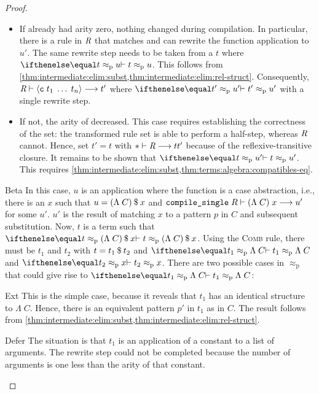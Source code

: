 \begin{proof}
\begin{induction}
      \begin{itemize}
        \item
          If  already had arity zero, nothing changed during compilation.
          In particular, there is a rule in $\textit{R}$ that matches and can rewrite the function application to $u'$.
          The same rewrite step needs to be taken from a $t$ where $\corrp{t}{u}$.
          This follows from \cref{thm:intermediate:elim:subst,thm:intermediate:elim:rel-struct}.
          Consequently, $\textit{R} \vdash \left\langle\texttt{\textup{c}}\;t_1\;\ldots\;t_n\right\rangle \longrightarrow t'$ where $\corrp{t'}{u'}$ with a single rewrite step.
        \item
          If not, the arity of  decreased.
          This case requires establishing the correctness of the  set:
          the transformed rule set is able to perform a half-step, whereas $\textit{R}$ cannot.
          Hence, set $t' = t$ with $* \vdash \textit{R} \longrightarrow t{t'}$ because of the reflexive-transitive closure.
          It remains to be shown that $\corrp{t}{u'}$.
          This requires \cref{thm:intermediate:elim:subst,thm:terms:algebra:compatibles-eq}.
      \end{itemize}
    \item[Beta]
      In this case, $u$ is an application where the function is a case abstraction, i.e., there is an $x$ such that $u = (\Lambda\;C)\mathbin{\$}x$ and $\texttt{\textup{compile\_single}}\;R \vdash (\Lambda\;C)\;x \longrightarrow u'$ for some $u'$.
      $u'$ is the result of matching $x$ to a pattern $p$ in $C$ and subsequent substitution.
      Now, $t$ is a term such that $\corrp{t}{\app{(\Lambda\;C)}{x}}$.
      Using the \textsc{Comb} rule, there must be $t_1$ and $t_2$ with $t = t_1\mathbin{\$}t_2$ and $\corrp{t_1}{\Lambda\;C}$ and $\corrp{t_2}{x}$.
      There are two possible cases in $\approx_\text{p}$ that could give rise to $\corrp{t_1}{\Lambda\;C}$:
      \begin{semantics}
        \item[Ext]
          This is the simple case, because it reveals that $t_1$ has an identical structure to $\Lambda\;C$.
          Hence, there is an equivalent pattern $p'$ in $t_1$ as in $C$.
          The result follows from \cref{thm:intermediate:elim:subst,thm:intermediate:elim:rel-struct}.
        \item[Defer]
          The situation is that $t_1$ is an application of a constant to a list of arguments.
          The rewrite step could not be completed because the number of arguments is one less than the arity of that constant.

\end{semantics}
\end{induction}
\end{proof}
